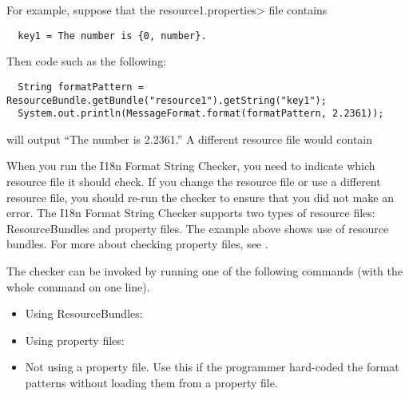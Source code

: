 \noindent For example, suppose that the \<resource1.properties> file contains

\begin{Verbatim}
  key1 = The number is {0, number}.
\end{Verbatim}

\noindent Then code such as the following:

\begin{Verbatim}
  String formatPattern = ResourceBundle.getBundle("resource1").getString("key1");
  System.out.println(MessageFormat.format(formatPattern, 2.2361));
\end{Verbatim}

\noindent will output ``The number is 2.2361.''  A different resource file would contain

When you run the I18n Format String Checker, you need to indicate which resource file it
should check. If you change the resource file or use a different resource
file, you should re-run the checker
to ensure that you did not make an error. The I18n Format String Checker supports two types of
resource files: ResourceBundles and property files. The example above shows use of
resource bundles.
For more about checking property files, see .



The checker can be invoked by running one of the following commands (with
the whole command on one line).

\begin{itemize}
  \item Using ResourceBundles:

    \begin{smaller}
    \end{smaller}

  \item Using property files:

    \begin{smaller}
    \end{smaller}

  \item Not using a property file.  Use this if the programmer hard-coded the
  format patterns without loading them from a property file.

    \begin{smaller}
    \end{smaller}
\end{itemize}


